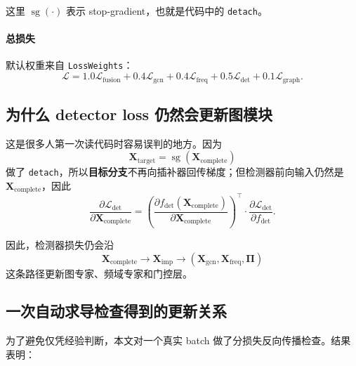 \documentclass[UTF8]{ctexart}
\begin{document}
这里 \(\operatorname{sg}(\cdot)\) 表示 stop-gradient，也就是代码中的 \verb|detach|。

\paragraph{总损失}
默认权重来自 \verb|LossWeights|：
\begin{equation}
    \mathcal{L}
    =
    1.0 \mathcal{L}_{\text{fusion}}
    + 0.4 \mathcal{L}_{\text{gcn}}
    + 0.4 \mathcal{L}_{\text{freq}}
    + 0.5 \mathcal{L}_{\text{det}}
    + 0.1 \mathcal{L}_{\text{graph}}.
\end{equation}

\subsection{为什么 detector loss 仍然会更新图模块}

这是很多人第一次读代码时容易误判的地方。因为
\begin{equation}
    \bm{X}_{\text{target}} = \operatorname{sg}(\bm{X}_{\text{complete}})
\end{equation}
做了 \verb|detach|，所以\textbf{目标分支}不再向插补器回传梯度；但检测器前向输入仍然是 \(\bm{X}_{\text{complete}}\)，因此
\begin{equation}
    \frac{\partial \mathcal{L}_{\text{det}}}{\partial \bm{X}_{\text{complete}}}
    =
    \left(
        \frac{\partial f_{\text{det}}(\bm{X}_{\text{complete}})}
        {\partial \bm{X}_{\text{complete}}}
    \right)^{\top}
    \cdot
    \frac{\partial \mathcal{L}_{\text{det}}}{\partial f_{\text{det}}}.
\end{equation}

因此，检测器损失仍会沿
\begin{equation}
    \bm{X}_{\text{complete}}
    \rightarrow
    \bm{X}_{\text{imp}}
    \rightarrow
    (\bm{X}_{\text{gcn}}, \bm{X}_{\text{freq}}, \bm{\Pi})
\end{equation}
这条路径更新图专家、频域专家和门控层。

\subsection{一次自动求导检查得到的更新关系}

为了避免仅凭经验判断，本文对一个真实 batch 做了分损失反向传播检查。结果表明：
\end{document}
